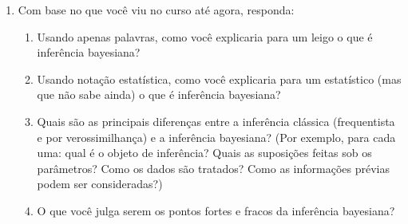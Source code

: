 \documentclass[11pt,a4]{article}\usepackage[]{graphicx}\usepackage[]{xcolor}
\begin{document}
\begin{enumerate}
\begin{enumerate}
  \end{enumerate}


\item{ Com base no que você viu no curso até agora, responda:
    \begin{enumerate}
    \item Usando apenas palavras, como você explicaria para um leigo o
      que é inferência bayesiana?
    \item Usando notação estatística, como você explicaria para um
      estatístico (mas que não sabe ainda) o que é inferência bayesiana?
    \item Quais são as principais diferenças entre a inferência clássica
      (frequentista e por verossimilhança) e a inferência bayesiana?
      (Por exemplo, para cada uma: qual é o objeto de inferência? Quais
      as suposições feitas sob os parâmetros? Como os dados são
      tratados? Como as informações prévias podem ser consideradas?)
    \item O que você julga serem os pontos fortes e fracos da inferência
      bayesiana?
    \end{enumerate}
  }







\end{enumerate}
\end{document}
